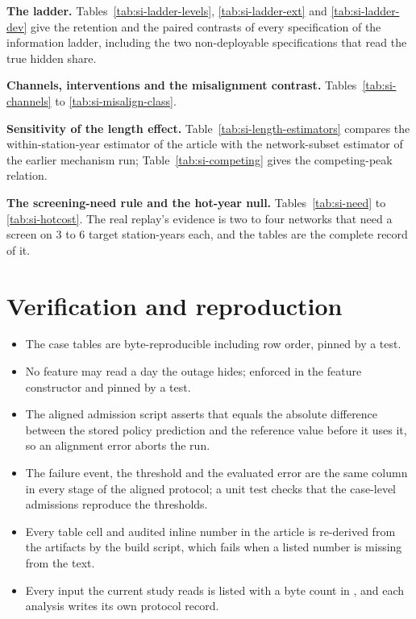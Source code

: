 \documentclass[draft]{agujournal2025}
\let\wrrtexttt\texttt
\renewcommand{\texttt}[1]{\wrrtexttt{\seqsplit{#1}}}
\begin{document}
\textbf{The ladder.} Tables~\ref{tab:si-ladder-levels}, \ref{tab:si-ladder-ext} and
\ref{tab:si-ladder-dev} give the retention and the paired contrasts of every
specification of the information ladder, including the two non-deployable
specifications that read the true hidden share.

\textbf{Channels, interventions and the misalignment contrast.}
Tables~\ref{tab:si-channels} to \ref{tab:si-misalign-class}.

\textbf{Sensitivity of the length effect.} Table~\ref{tab:si-length-estimators}
compares the within-station-year estimator of the article with the network-subset
estimator of the earlier mechanism run; Table~\ref{tab:si-competing} gives the
competing-peak relation.

\textbf{The screening-need rule and the hot-year null.} Tables~\ref{tab:si-need}
to \ref{tab:si-hotcost}. The real replay's evidence is two to four networks that
need a screen on 3 to 6 target station-years each, and the tables are the
complete record of it.



\section{Verification and reproduction}

\begin{itemize}
  \item The case tables are byte-reproducible including row order, pinned by a
    test.
  \item No feature may read a day the outage hides; enforced in the feature
    constructor and pinned by a test.
  \item The aligned admission script asserts that \texttt{abserr\_policy} equals
    the absolute difference between the stored policy prediction and the
    reference value before it uses it, so an alignment error aborts the run.
  \item The failure event, the threshold and the evaluated error are the same
    column in every stage of the aligned protocol; a unit test checks that the
    case-level admissions reproduce the thresholds.
  \item Every table cell and audited inline number in the article is re-derived
    from the artifacts by the build script, which fails when a listed number is
    missing from the text.
  \item Every input the current study reads is listed with a byte count in
    \texttt{current\_data\_manifest.csv}, and each analysis writes
    its own protocol record.
\end{itemize}
\end{document}
